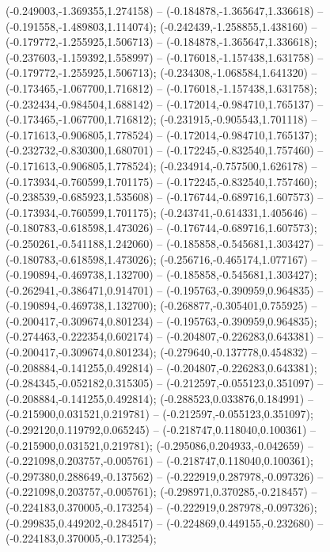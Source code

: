  (-0.249003,-1.369355,1.274158) -- (-0.184878,-1.365647,1.336618) -- (-0.191558,-1.489803,1.114074);
 (-0.242439,-1.258855,1.438160) -- (-0.179772,-1.255925,1.506713) -- (-0.184878,-1.365647,1.336618);
 (-0.237603,-1.159392,1.558997) -- (-0.176018,-1.157438,1.631758) -- (-0.179772,-1.255925,1.506713);
 (-0.234308,-1.068584,1.641320) -- (-0.173465,-1.067700,1.716812) -- (-0.176018,-1.157438,1.631758);
 (-0.232434,-0.984504,1.688142) -- (-0.172014,-0.984710,1.765137) -- (-0.173465,-1.067700,1.716812);
 (-0.231915,-0.905543,1.701118) -- (-0.171613,-0.906805,1.778524) -- (-0.172014,-0.984710,1.765137);
 (-0.232732,-0.830300,1.680701) -- (-0.172245,-0.832540,1.757460) -- (-0.171613,-0.906805,1.778524);
 (-0.234914,-0.757500,1.626178) -- (-0.173934,-0.760599,1.701175) -- (-0.172245,-0.832540,1.757460);
 (-0.238539,-0.685923,1.535608) -- (-0.176744,-0.689716,1.607573) -- (-0.173934,-0.760599,1.701175);
 (-0.243741,-0.614331,1.405646) -- (-0.180783,-0.618598,1.473026) -- (-0.176744,-0.689716,1.607573);
 (-0.250261,-0.541188,1.242060) -- (-0.185858,-0.545681,1.303427) -- (-0.180783,-0.618598,1.473026);
 (-0.256716,-0.465174,1.077167) -- (-0.190894,-0.469738,1.132700) -- (-0.185858,-0.545681,1.303427);
 (-0.262941,-0.386471,0.914701) -- (-0.195763,-0.390959,0.964835) -- (-0.190894,-0.469738,1.132700);
 (-0.268877,-0.305401,0.755925) -- (-0.200417,-0.309674,0.801234) -- (-0.195763,-0.390959,0.964835);
 (-0.274463,-0.222354,0.602174) -- (-0.204807,-0.226283,0.643381) -- (-0.200417,-0.309674,0.801234);
 (-0.279640,-0.137778,0.454832) -- (-0.208884,-0.141255,0.492814) -- (-0.204807,-0.226283,0.643381);
 (-0.284345,-0.052182,0.315305) -- (-0.212597,-0.055123,0.351097) -- (-0.208884,-0.141255,0.492814);
 (-0.288523,0.033876,0.184991) -- (-0.215900,0.031521,0.219781) -- (-0.212597,-0.055123,0.351097);
 (-0.292120,0.119792,0.065245) -- (-0.218747,0.118040,0.100361) -- (-0.215900,0.031521,0.219781);
 (-0.295086,0.204933,-0.042659) -- (-0.221098,0.203757,-0.005761) -- (-0.218747,0.118040,0.100361);
 (-0.297380,0.288649,-0.137562) -- (-0.222919,0.287978,-0.097326) -- (-0.221098,0.203757,-0.005761);
 (-0.298971,0.370285,-0.218457) -- (-0.224183,0.370005,-0.173254) -- (-0.222919,0.287978,-0.097326);
 (-0.299835,0.449202,-0.284517) -- (-0.224869,0.449155,-0.232680) -- (-0.224183,0.370005,-0.173254);
